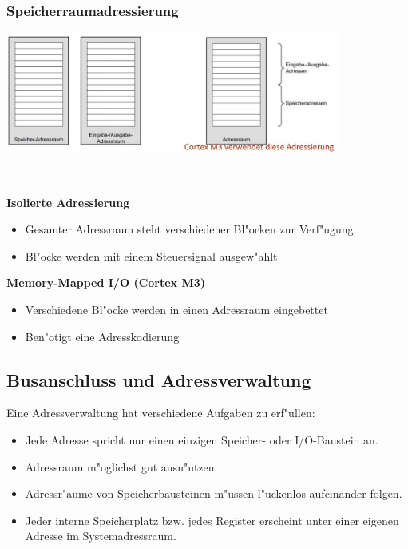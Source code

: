 \subsubsection{Speicherraumadressierung}
\begin{minipage}{11cm}
	\includegraphics[width=11cm]{images/Speicherraumadressierung}
\end{minipage}
%
\begin{minipage}{0.5cm}
	\-\
\end{minipage}
%
\begin{minipage}{7cm}
	\textbf{Isolierte Adressierung}
	\begin{itemize}
		\item Gesamter Adressraum steht verschiedener Bl"ocken zur Verf"ugung
		\item Bl"ocke werden mit einem Steuersignal ausgew"ahlt
	\end{itemize}
	\textbf{Memory-Mapped I/O (Cortex M3)}
	\begin{itemize}
		\item Verschiedene Bl"ocke werden in einen Adressraum eingebettet
		\item Ben"otigt eine Adresskodierung
	\end{itemize}
\end{minipage}

\newpage
\subsection{Busanschluss und Adressverwaltung}
Eine Adressverwaltung hat verschiedene Aufgaben zu erf"ullen:
\begin{itemize}
	\item Jede Adresse spricht nur einen einzigen Speicher- oder I/O-Baustein an.
	\item Adressraum m"oglichst gut ausn"utzen
	\item Adressr"aume von Speicherbausteinen m"ussen l"uckenlos aufeinander folgen.
	\item Jeder interne Speicherplatz bzw. jedes Register erscheint unter einer eigenen Adresse im Systemadressraum.
\end{itemize}

